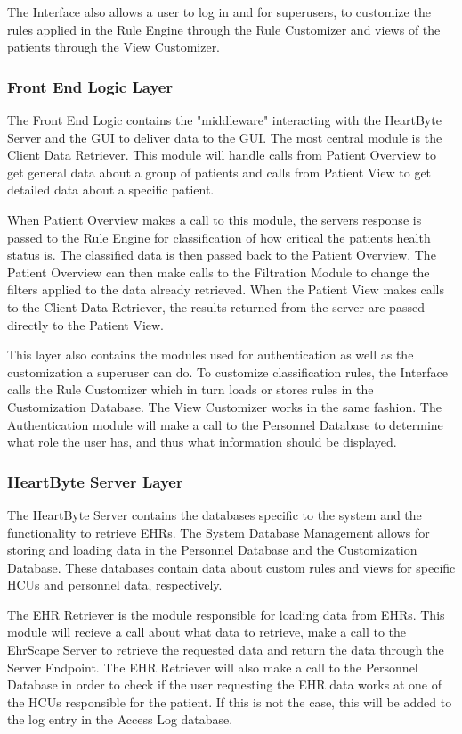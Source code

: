 \documentclass{article}
\begin{document}
The Interface also allows a user to log in and for superusers, to customize the rules applied in the Rule Engine through the Rule Customizer and views of the patients through the View Customizer.

\subsubsection{Front End Logic Layer}
The Front End Logic contains the "middleware" interacting with the HeartByte Server and the GUI to deliver data to the GUI. The most central module is the Client Data Retriever. This module will handle calls from Patient Overview to get general data about a group of patients and calls from Patient View to get detailed data about a specific patient. 

When Patient Overview makes a call to this module, the servers response is passed to the Rule Engine for classification of how critical the patients health status is. The classified data is then passed back to the Patient Overview. The Patient Overview can then make calls to the Filtration Module to change the filters applied to the data already retrieved. When the Patient View makes calls to the Client Data Retriever, the results returned from the server are passed directly to the Patient View.

This layer also contains the modules used for authentication as well as the customization a superuser can do. To customize classification rules, the Interface calls the Rule Customizer which in turn loads or stores rules in the Customization Database. The View Customizer works in the same fashion. The Authentication module will make a call to the Personnel Database to determine what role the user has, and thus what information should be displayed.

\subsubsection{HeartByte Server Layer}
The HeartByte Server contains the databases specific to the system and the functionality to retrieve EHRs. The System Database Management allows for storing and loading data in the Personnel Database and the Customization Database. These databases contain data about custom rules and views for specific HCUs and personnel data, respectively.

The EHR Retriever is the module responsible for loading data from EHRs. This module will recieve a call about what data to retrieve, make a call to the EhrScape Server to retrieve the requested data and return the data through the Server Endpoint. The EHR Retriever will also make a call to the Personnel Database in order to check if the user requesting the EHR data works at one of the HCUs responsible for the patient. If this is not the case, this will be added to the log entry in the Access Log database.
\end{document}
